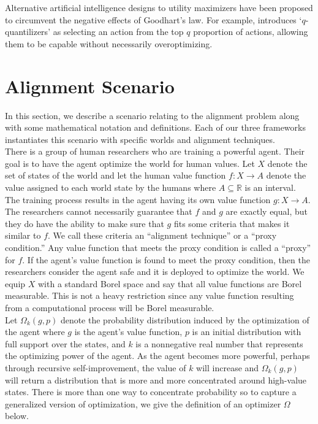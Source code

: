 \documentclass{article}
\begin{document}
Alternative artificial intelligence designs to utility maximizers have been proposed to circumvent the negative effects of Goodhart's law. For example, \citet{taylor2016quantilizers} introduces `$q$-quantilizers' as selecting an action from the top $q$ proportion of actions, allowing them to be capable without necessarily overoptimizing.

\section{Alignment Scenario} \label{sec:alignmentScenario}
In this section, we describe a scenario relating to the alignment problem along with some mathematical notation and definitions. Each of our three frameworks instantiates this scenario with specific worlds and alignment techniques.\\

There is a group of human researchers who are training a powerful agent. Their goal is to have the agent optimize the world for human values. Let $X$ denote the set of states of the world and let the human value function $f : X \rightarrow A$ denote the value assigned to each world state by the humans where $A \subseteq \mathbb R$ is an interval.\\

The training process results in the agent having its own value function $g : X \rightarrow A$. The researchers cannot necessarily guarantee that $f$ and $g$ are exactly equal, but they do have the ability to make sure that $g$ fits some criteria that makes it similar to $f$. We call these criteria an ``alignment technique'' or a ``proxy condition.'' Any value function that meets the proxy condition is called a ``proxy'' for $f$. If the agent's value function is found to meet the proxy condition, then the researchers consider the agent safe and it is deployed to optimize the world. We equip $X$ with a standard Borel space and say that all value functions are Borel measurable. This is not a heavy restriction since any value function resulting from a computational process will be Borel measurable.\\

Let $\Omega_k(g,p)$ denote the probability distribution induced by the optimization of the agent where $g$ is the agent's value function, $p$ is an initial distribution with full support over the states, and $k$ is a nonnegative real number that represents the optimizing power of the agent. As the agent becomes more powerful, perhaps through recursive self-improvement, the value of $k$ will increase and $\Omega_k(g,p)$ will return a distribution that is more and more concentrated around high-value states. There is more than one way to concentrate probability so to capture a generalized version of optimization, we give the definition of an optimizer $\Omega$ below.
\end{document}
